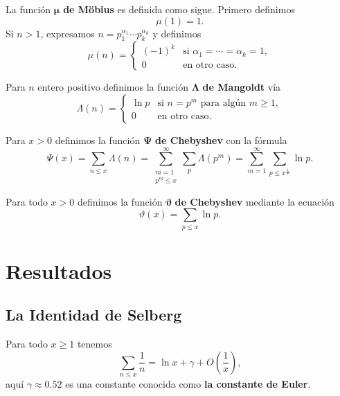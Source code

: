 \begin{defn}
La funci\'on $\boldsymbol{\mu}$ \textbf{de M\"{o}bius} es definida como sigue. 
Primero definimos 
\[
\mu(1) = 1.
\]
Si $n > 1$, expresamos $n = p_1^{\alpha_1} \cdots p_k^{\alpha_k}$ y 
definimos 
\[
\mu(n) = 
\begin{cases}
(-1)^k &\text{si } \alpha_1 = \cdots = \alpha_k = 1, \\
0 &\text{en otro caso}. 
\end{cases}
\]
\end{defn}

\begin{defn}
Para $n$ entero positivo definimos la funci\'on $\boldsymbol{\Lambda}$ \textbf{de Mangoldt} v\'ia 
\[
\Lambda(n) =
\begin{cases}
\ln p &\text{si } n = p^m \text{ para alg\'un } m \geq 1,\\
0 &\text{en otro caso.}
\end{cases}
\]
\end{defn}

\begin{defn}
Para $x > 0$ definimos la funci\'on $\boldsymbol{\Psi}$ \textbf{de Chebyshev} con la f\'ormula
\[
\Psi(x) = \sum_{n \leq x} \Lambda(n) 
= \sum_{\substack{m = 1\\p^m \leq x}}^\infty \sum_p \Lambda(p^m)
= \sum_{m = 1}^\infty \sum_{p \leq x^{\frac{1}{m}}} \ln p.
\]
\end{defn}

\begin{defn}
Para todo $x > 0$ definimos la funci\'on $\boldsymbol{\vartheta}$ \textbf{de Chebyshev} mediante la ecuaci\'on
\[
\vartheta(x) = \sum_{p \leq x} \ln p.
\]
\end{defn}

\section{Resultados}

\subsection{La Identidad de Selberg}

\begin{lemma}\label{lem08}
Para todo $x \geq 1$ tenemos
\[
\sum_{n \leq x} \frac{1}{n} = \ln x + \gamma + O\left(\frac{1}{x}\right),
\]
aqu\'i $\gamma \approx 0.52$ es una constante conocida como {\bf la constante de Euler}. 
\end{lemma}

